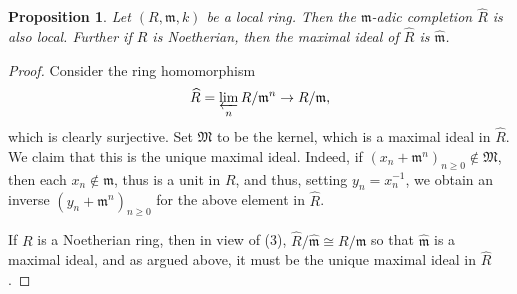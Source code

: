 \documentclass[11pt]{article}
\theoremstyle{thmstyle}
\newtheorem{proposition}[theorem]{Proposition}
\theoremstyle{defstyle}
\newcommand{\frakM}{\mathfrak{M}} %
\newcommand{\frakm}{\mathfrak{m}} %
\newcommand{\wh}[1]{\widehat{#1}}
\renewcommand{\ge}{\geqslant}
\begin{document}
\begin{proposition}
    Let $(R, \frakm, k)$ be a local ring. Then the $\frakm$-adic completion $\wh R$ is also local. Further if $R$ is Noetherian, then the maximal ideal of $\wh R$ is $\wh\frakm$.
\end{proposition}
\begin{proof}
    Consider the ring homomorphism
    \begin{equation*}
        \wh R = \varprojlim_n R/\frakm^n\to R/\frakm,
    \end{equation*}
    which is clearly surjective. Set $\frakM$ to be the kernel, which is a maximal ideal in $\wh R$. We claim that this is the unique maximal ideal. Indeed, if $(x_n + \frakm^n)_{n\ge 0}\notin\frakM$, then each $x_n\notin\frakm$, thus is a unit in $R$, and thus, setting $y_n = x_n^{-1}$, we obtain an inverse $(y_n + \frakm^n)_{n\ge 0}$ for the above element in $\wh R$.

    If $R$ is a Noetherian ring, then in view of  (3), $\wh R/\wh\frakm\cong R/\frakm$ so that $\wh\frakm$ is a maximal ideal, and as argued above, it must be the unique maximal ideal in $\wh R$.
\end{proof}
\end{document}
